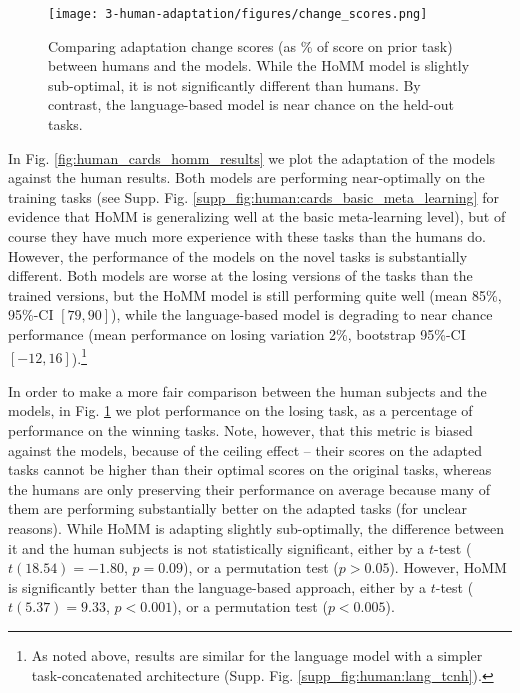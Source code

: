 \begin{figure}
\centering
\texttt{[image: 3-human-adaptation/figures/change\_scores.png]}
\caption[Comparing adaptation change scores between the humans and models.]{Comparing adaptation change scores (as \% of score on prior task) between humans and the models. While the HoMM model is slightly sub-optimal, it is not significantly different than humans. By contrast, the language-based model is near chance on the held-out tasks.} \label{fig:human_cards_homm_change_scores}
\end{figure}
In Fig. \ref{fig:human_cards_homm_results} we plot the adaptation of the models against the human results. Both models are performing near-optimally on the training tasks (see Supp. Fig. \ref{supp_fig:human:cards_basic_meta_learning} for evidence that HoMM is generalizing well at the basic meta-learning level), but of course they have much more experience with these tasks than the humans do. However, the performance of the models on the novel tasks is substantially different. Both models are worse at the losing versions of the tasks than the trained versions, but the HoMM model is still performing quite well (mean 85\%, 95\%-CI \([79, 90]\)), while the language-based model is degrading to near chance performance (mean performance on losing variation 2\%, bootstrap 95\%-CI \([-12, 16]\)).\footnote{As noted above, results are similar for the language model with a simpler task-concatenated architecture (Supp. Fig. \ref{supp_fig:human:lang_tcnh}).} \par
In order to make a more fair comparison between the human subjects and the models, in Fig. \ref{fig:human_cards_homm_change_scores} we plot performance on the losing task, as a percentage of performance on the winning tasks. Note, however, that this metric is biased against the models, because of the ceiling effect -- their scores on the adapted tasks cannot be higher than their optimal scores on the original tasks, whereas the humans are only preserving their performance on average because many of them are performing substantially better on the adapted tasks (for unclear reasons). While HoMM is adapting slightly sub-optimally, the difference between it and the human subjects is not statistically significant, either by a \(t\)-test (\(t(18.54) = -1.80\), \(p = 0.09\)), or a permutation test (\(p > 0.05\)). However, HoMM is significantly better than the language-based approach, either by a   \(t\)-test (\(t(5.37) = 9.33\), \(p < 0.001\)), or a permutation test (\(p < 0.005\)). \par


